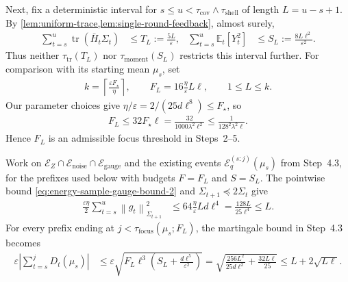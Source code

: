 \documentclass{article}
\newcommand{\E}{\mathbb E}
\newcommand{\tr}{\operatorname{tr}}
\newcommand{\1}{\mathbf 1}
\newcommand{\eps}{\varepsilon}
\newcommand{\normm}[2]{\left\lVert #1\right\rVert_{#2}}
\begin{document}
Next, fix a deterministic interval for $s\leq u<\tau_{\mathrm{cov}}\wedge\tau_{\mathrm{shell}}$ of length $L=u-s+1$.
By \cref{lem:uniform-trace,lem:single-round-feedback}, almost surely,
\begin{align}
    \sum_{t=s}^{u}\tr(\bar{H}_t\Sigma_t)
     & \leq T_L:=\frac{5L}{\eps},
     & \sum_{t=s}^{u}\E_t[Y_t^2]
     & \leq S_L:=\frac{8L\ell^2}{\eps^2}.
    \label{eq:confinement-local-budgets}
\end{align}
Thus neither $\tau_{\mathrm{tr}}(T_L)$ nor
$\tau_{\mathrm{moment}}(S_L)$ restricts this interval further.
For comparison with its starting mean $\mu_s$, set
\begin{align}
    k=\left\lceil\frac{\eps F_\star}{\eta}\right\rceil,
    \qquad
    F_L=16\frac{\eta}{\eps}L\ell,
    \qquad 1\leq L\leq k.
\end{align}
Our parameter choices give $\eta/\eps=2/(25d\ell^8)\leq F_\star$, so
\begin{align}
    F_L\leq32F_\star\ell
    =\frac{32}{1000\lambda^2\ell^2}
    \leq\frac{1}{128^2\lambda^2\ell}.
\end{align}
Hence $F_L$ is an admissible focus threshold in Steps~2--5.

Work on $\mathcal E_Z\cap\mathcal E_{\mathrm{noise}}
    \cap\mathcal E_{\mathrm{gauge}}$ and the existing events
$\mathcal E_{q}^{(s:j)}(\mu_s)$ from Step~4.3, for the prefixes
used below with budgets $F=F_L$ and $S=S_L$.
The pointwise bound \eqref{eq:energy-sample-gauge-bound-2} and
$\Sigma_{t+1}\preceq2\Sigma_t$ give
\begin{align}
    \frac{\eps\eta}{2}\sum_{t=s}^{u}
    \normm{g_t}{\Sigma_{t+1}}^2
     & \leq64\frac{\eta}{\eps}Ld\ell^4
    =\frac{128L}{25\ell^4}\leq L.
    \label{eq:confinement-local-energy}
\end{align}
For every prefix ending at $j<\tau_{\mathrm{focus}}(\mu_s;F_L)$,
the martingale bound in Step~4.3 becomes
\begin{align}
    \eps\left|\sum_{t=s}^{j}D_t(\mu_s)\right|
     & \leq\eps\sqrt{F_L\ell^3
        \left(S_L+\frac{d\ell^5}{\eps^2}\right)}
    =\sqrt{\frac{256L^2}{25d\ell^2}+\frac{32L\ell}{25}}
    \leq L+2\sqrt{L\ell}.
    \label{eq:confinement-local-martingale}
\end{align}
\end{document}
